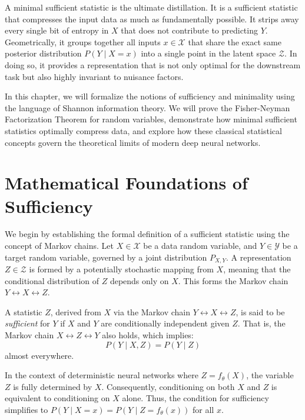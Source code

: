 A minimal sufficient statistic is the ultimate distillation. It is a sufficient statistic that compresses the input data as much as fundamentally possible. It strips away every single bit of entropy in $X$ that does not contribute to predicting $Y$. Geometrically, it groups together all inputs $x \in \mathcal{X}$ that share the exact same posterior distribution $P(Y \mid X=x)$ into a single point in the latent space $\mathcal{Z}$. In doing so, it provides a representation that is not only optimal for the downstream task but also highly invariant to nuisance factors. 

In this chapter, we will formalize the notions of sufficiency and minimality using the language of Shannon information theory. We will prove the Fisher-Neyman Factorization Theorem for random variables, demonstrate how minimal sufficient statistics optimally compress data, and explore how these classical statistical concepts govern the theoretical limits of modern deep neural networks.

\section{Mathematical Foundations of Sufficiency}

We begin by establishing the formal definition of a sufficient statistic using the concept of Markov chains. Let $X \in \mathcal{X}$ be a data random variable, and $Y \in \mathcal{Y}$ be a target random variable, governed by a joint distribution $P_{X,Y}$. A representation $Z \in \mathcal{Z}$ is formed by a potentially stochastic mapping from $X$, meaning that the conditional distribution of $Z$ depends only on $X$. This forms the Markov chain $Y \leftrightarrow X \leftrightarrow Z$.

\begin{definition}
A statistic $Z$, derived from $X$ via the Markov chain $Y \leftrightarrow X \leftrightarrow Z$, is said to be \emph{sufficient} for $Y$ if $X$ and $Y$ are conditionally independent given $Z$. That is, the Markov chain $X \leftrightarrow Z \leftrightarrow Y$ also holds, which implies:
\[ P(Y \mid X, Z) = P(Y \mid Z) \]
almost everywhere.
\end{definition}

In the context of deterministic neural networks where $Z = f_\theta(X)$, the variable $Z$ is fully determined by $X$. Consequently, conditioning on both $X$ and $Z$ is equivalent to conditioning on $X$ alone. Thus, the condition for sufficiency simplifies to $P(Y \mid X=x) = P(Y \mid Z=f_\theta(x))$ for all $x$.

